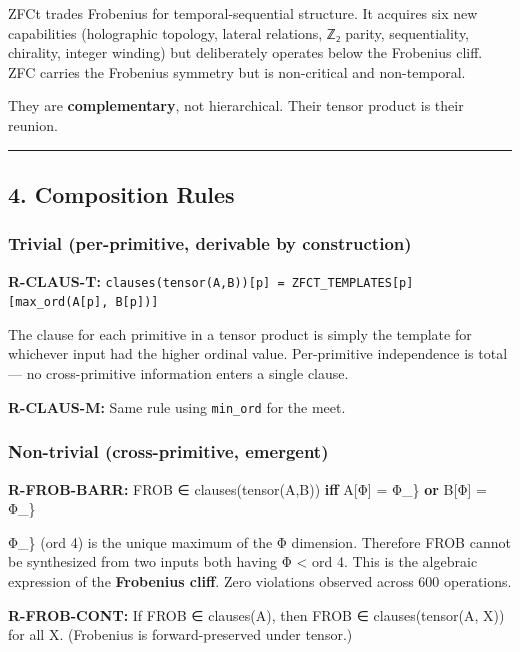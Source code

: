 ZFCt trades Frobenius for temporal-sequential structure. It acquires six
new capabilities (holographic topology, lateral relations, ℤ₂ parity,
sequentiality, chirality, integer winding) but deliberately
operates below the Frobenius cliff. ZFC carries the Frobenius symmetry
but is non-critical and non-temporal.

They are \textbf{complementary}, not hierarchical. Their tensor product
is their reunion.

\begin{center}\rule{0.5\linewidth}{0.5pt}\end{center}

\subsection{4. Composition Rules}\label{composition-rules}

\subsubsection{Trivial (per-primitive, derivable by
construction)}\label{trivial-per-primitive-derivable-by-construction}

\textbf{R-CLAUS-T:}
\texttt{clauses(tensor(A,B)){[}p{]}\ =\ ZFCT\_TEMPLATES{[}p{]}{[}max\_ord(A{[}p{]},\ B{[}p{]}){]}}

The clause for each primitive in a tensor product is simply the template
for whichever input had the higher ordinal value. Per-primitive
independence is total --- no cross-primitive information enters a single
clause.

\textbf{R-CLAUS-M:} Same rule using \texttt{min\_ord} for the meet.

\subsubsection{Non-trivial (cross-primitive,
emergent)}\label{non-trivial-cross-primitive-emergent}

\textbf{R-FROB-BARR:} FROB ∈ clauses(tensor(A,B)) \textbf{iff} A{[}Φ{]}
= Φ\_\} \textbf{or} B{[}Φ{]} = Φ\_\}

Φ\_\} (ord 4) is the unique maximum of the Φ dimension. Therefore FROB
cannot be synthesized from two inputs both having Φ \textless{} ord 4.
This is the algebraic expression of the \textbf{Frobenius cliff}. Zero
violations observed across 600 operations.

\textbf{R-FROB-CONT:} If FROB ∈ clauses(A), then FROB ∈
clauses(tensor(A, X)) for all X. (Frobenius is forward-preserved under
tensor.)

